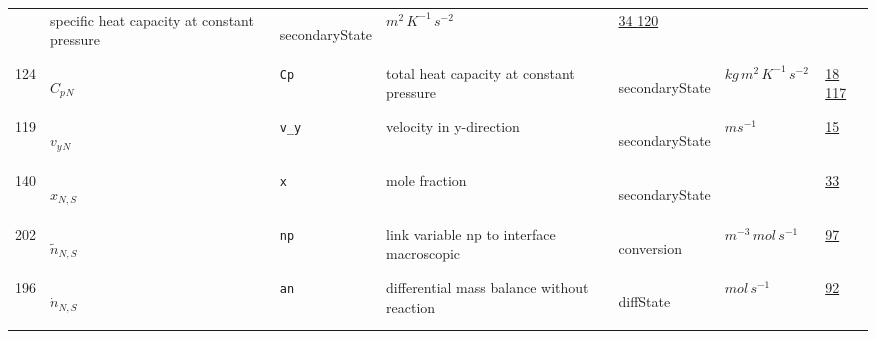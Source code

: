 \begin{longtable}{|p{1cm}|p{2.5cm}|p{4.5cm}|p{8cm}|p{3.0cm}|p{3cm}|p{1cm}|}
             & specific heat capacity at constant pressure
             & \begin{lay}secondaryState \end{lay}
             & $ m^{2} \,K^{-1} \,s^{-2} \, $
             &                 \hyperlink{"e:34"}{ 34 }
                                 \hyperlink{"e:120"}{ 120 }
                 \\
            124
             & \hypertarget{"v:124"}{ $ {{C_p}}{_{N}} $}
             & \verb|Cp|
             & total heat capacity at constant pressure
             & \begin{lay}secondaryState \end{lay}
             & $ kg \,m^{2} \,K^{-1} \,s^{-2} \, $
             &                 \hyperlink{"e:18"}{ 18 }
                                 \hyperlink{"e:117"}{ 117 }
                 \\
            119
             & \hypertarget{"v:119"}{ $ {{v_y}}{_{N}} $}
             & \verb|v_y|
             & velocity in y-direction
             & \begin{lay}secondaryState \end{lay}
             & $ m s^{-1} \, $
             &                 \hyperlink{"e:15"}{ 15 }
                 \\
            140
             & \hypertarget{"v:140"}{ $ {x}{_{N, S}} $}
             & \verb|x|
             & mole fraction
             & \begin{lay}secondaryState \end{lay}
             & $  $
             &                 \hyperlink{"e:33"}{ 33 }
                 \\
            202
             & \hypertarget{"v:202"}{ $ {{\tilde{n}}}{_{N, S}} $}
             & \verb|np|
             & link variable  np to interface macroscopic
             & \begin{lay}conversion \end{lay}
             & $ m^{-3} \,mol \,s^{-1} \, $
             &                 \hyperlink{"e:97"}{ 97 }
                 \\
            196
             & \hypertarget{"v:196"}{ $ {{\dot{n}}}{_{N, S}} $}
             & \verb|an|
             & differential mass balance without reaction
             & \begin{lay}diffState \end{lay}
             & $ mol \,s^{-1} \, $
             &                 \hyperlink{"e:92"}{ 92 }
                 \\

\end{longtable}
